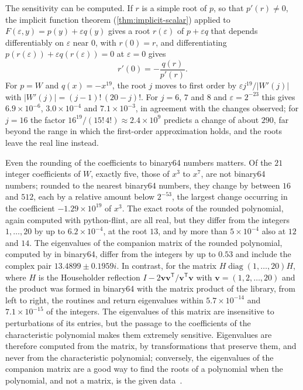The sensitivity can be computed. If $r$ is a simple root of $p$, so that $p'(r)\ne0$, the implicit function theorem (\cref{thm:implicit-scalar}) applied to $F(\varepsilon,y)=p(y)+\varepsilon q(y)$ gives a root $r(\varepsilon)$ of $p+\varepsilon q$ that depends differentiably on $\varepsilon$ near $0$, with $r(0)=r$, and differentiating $p(r(\varepsilon))+\varepsilon q(r(\varepsilon))=0$ at $\varepsilon=0$ gives
\[
r'(0)=-\frac{q(r)}{p'(r)} .
\]
For $p=W$ and $q(x)=-x^{19}$, the root $j$ moves to first order by $\varepsilon j^{19}/|W'(j)|$ with $|W'(j)|=(j-1)!\,(20-j)!$. For $j=6$, $7$ and $8$ and $\varepsilon=2^{-23}$ this gives $6.9\times10^{-6}$, $3.0\times10^{-4}$ and $7.1\times10^{-3}$, in agreement with the changes observed; for $j=16$ the factor $16^{19}/(15!\,4!)\approx2.4\times10^9$ predicts a change of about $290$, far beyond the range in which the first-order approximation holds, and the roots leave the real line instead.

Even the rounding of the coefficients to binary64 numbers matters. Of the $21$ integer coefficients of $W$, exactly five, those of $x^3$ to $x^7$, are not binary64 numbers; rounded to the nearest binary64 numbers, they change by between $16$ and $512$, each by a relative amount below $2^{-53}$, the largest change occurring in the coefficient $-1.29\times10^{19}$ of $x^3$. The exact roots of the rounded polynomial, again computed with python-flint, are all real, but they differ from the integers $1,\ldots,20$ by up to $6.2\times10^{-4}$, at the root $13$, and by more than $5\times10^{-4}$ also at $12$ and $14$. The eigenvalues of the companion matrix of the rounded polynomial, computed by  in binary64, differ from the integers by up to $0.53$ and include the complex pair $13.4899\pm0.1959i$. In contrast, for the matrix $H\operatorname{diag}(1,\ldots,20)H$, where $H$ is the Householder reflection $I-2\mathbf v\mathbf v^{\mathsf T}/\mathbf v^{\mathsf T}\mathbf v$ with $\mathbf v=(1,2,\ldots,20)$ and the product was formed in binary64 with the matrix product of the library, from left to right, the routines  and  return eigenvalues within $5.7\times10^{-14}$ and $7.1\times10^{-15}$ of the integers. The eigenvalues of this matrix are insensitive to perturbations of its entries, but the passage to the coefficients of the characteristic polynomial makes them extremely sensitive. Eigenvalues are therefore computed from the matrix, by transformations that preserve them, and never from the characteristic polynomial; conversely, the eigenvalues of the companion matrix are a good way to find the roots of a polynomial when the polynomial, and not a matrix, is the given data~\cite{edelman1995}.

